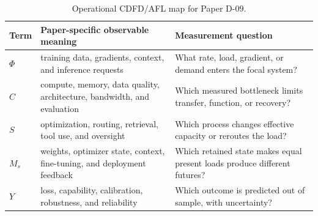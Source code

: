 \documentclass[12pt,a4paper]{article}
\begin{document}
\begin{table}[htbp]
\centering
\small
\caption{Operational CDFD/AFL map for Paper D-09.}
\begin{tabularx}{\textwidth}{|l|X|X|}
\hline
\textbf{Term} & \textbf{Paper-specific observable meaning} & \textbf{Measurement question} \\
\hline
$\Phi$ & training data, gradients, context, and inference requests & What rate, load, gradient, or demand enters the focal system? \\
\hline
$C$ & compute, memory, data quality, architecture, bandwidth, and evaluation & Which measured bottleneck limits transfer, function, or recovery? \\
\hline
$S$ & optimization, routing, retrieval, tool use, and oversight & Which process changes effective capacity or reroutes the load? \\
\hline
$M_s$ & weights, optimizer state, context, fine-tuning, and deployment feedback & Which retained state makes equal present loads produce different futures? \\
\hline
$Y$ & loss, capability, calibration, robustness, and reliability & Which outcome is predicted out of sample, with uncertainty? \\
\hline
\end{tabularx}
\end{table}
\end{document}
